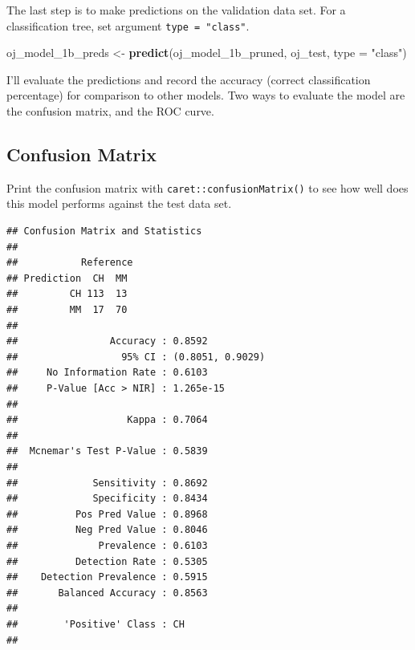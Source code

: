 \documentclass[]{book}
\newenvironment{Shaded}{\begin{snugshade}}{\end{snugshade}}
\newcommand{\DataTypeTok}[1]{\textcolor[rgb]{0.13,0.29,0.53}{#1}}
\newcommand{\KeywordTok}[1]{\textcolor[rgb]{0.13,0.29,0.53}{\textbf{#1}}}
\newcommand{\NormalTok}[1]{#1}
\newcommand{\OperatorTok}[1]{\textcolor[rgb]{0.81,0.36,0.00}{\textbf{#1}}}
\newcommand{\StringTok}[1]{\textcolor[rgb]{0.31,0.60,0.02}{#1}}
\begin{document}
The last step is to make predictions on the validation data set. For a classification tree, set argument \texttt{type\ =\ "class"}.

\begin{Shaded}
\begin{Highlighting}[]
\NormalTok{oj_model_1b_preds <-}\StringTok{ }\KeywordTok{predict}\NormalTok{(oj_model_1b_pruned, oj_test, }\DataTypeTok{type =} \StringTok{"class"}\NormalTok{)}
\end{Highlighting}
\end{Shaded}

I'll evaluate the predictions and record the accuracy (correct classification percentage) for comparison to other models. Two ways to evaluate the model are the confusion matrix, and the ROC curve.

\hypertarget{confusion-matrix}{%
\subsection{Confusion Matrix}\label{confusion-matrix}}

Print the confusion matrix with \texttt{caret::confusionMatrix()} to see how well does this model performs against the test data set.

\begin{Shaded}
\end{Shaded}

\begin{verbatim}
## Confusion Matrix and Statistics
## 
##           Reference
## Prediction  CH  MM
##         CH 113  13
##         MM  17  70
##                                           
##                Accuracy : 0.8592          
##                  95% CI : (0.8051, 0.9029)
##     No Information Rate : 0.6103          
##     P-Value [Acc > NIR] : 1.265e-15       
##                                           
##                   Kappa : 0.7064          
##                                           
##  Mcnemar's Test P-Value : 0.5839          
##                                           
##             Sensitivity : 0.8692          
##             Specificity : 0.8434          
##          Pos Pred Value : 0.8968          
##          Neg Pred Value : 0.8046          
##              Prevalence : 0.6103          
##          Detection Rate : 0.5305          
##    Detection Prevalence : 0.5915          
##       Balanced Accuracy : 0.8563          
##                                           
##        'Positive' Class : CH              
## 
\end{verbatim}
\end{document}
